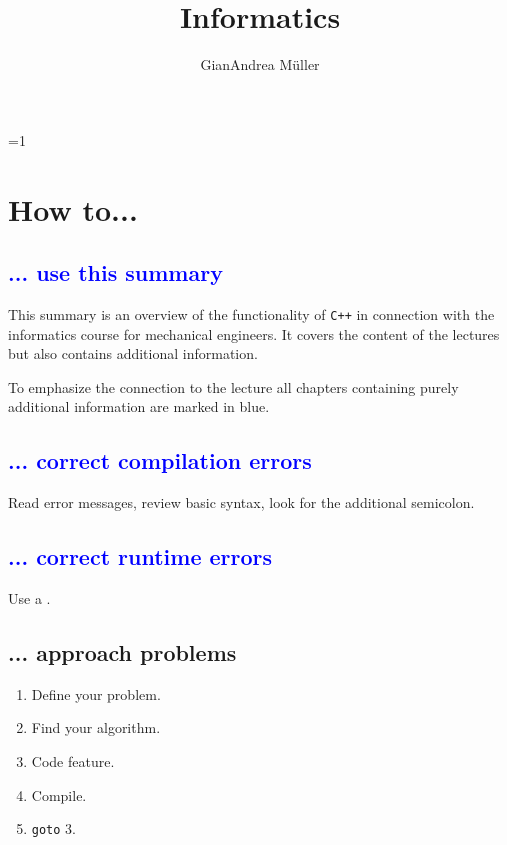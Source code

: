 \documentclass[10pt,a4paper]{scrartcl}
\title{Informatics}
\author{GianAndrea Müller}
\gdef\conditionmacro{1}
\begin{document}
\begin{multicols*}{4}
\maketitle
\tableofcontents
\end{multicols*}

\begin{multicols*}{2}

\newcommand{\ntn}[1]{\textcolor{blue}{#1}}

\ifnum\conditionmacro=1
\section{How to...}

\subsection{\ntn{... use this summary}}

This summary is an overview of the functionality of \verb.C++. in connection with the informatics course for mechanical engineers. It covers the content of the lectures but also contains additional information.

To emphasize the connection to the lecture all chapters containing purely additional information are marked in blue.

\subsection{\ntn{... correct compilation errors}}

Read error messages, review basic syntax, look for the additional semicolon.

\subsection{\ntn{... correct runtime errors}}

Use a .

\subsection{... approach problems}

\begin{enumerate}
\item Define your problem.
\item Find your algorithm.
\item Code feature.
\item Compile.
\item \verb+goto+ 3.
\end{enumerate}


\end{multicols*}
\end{document}
